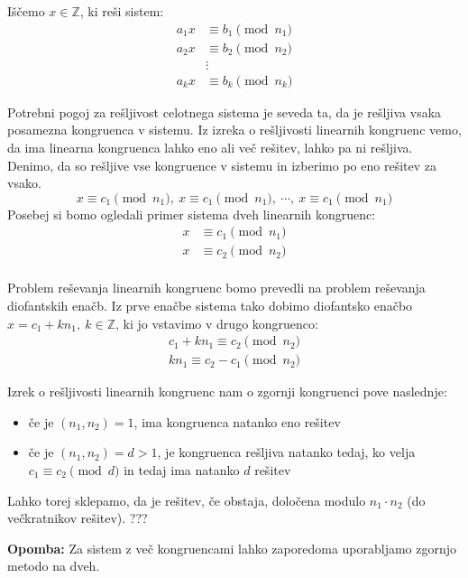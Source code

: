 \documentclass[12pt, a4paper]{article}
\newenvironment{opom}[1][]{\par\medskip\noindent \textbf{Opomba: }}{\medskip}
\begin{document}
Iščemo $x\in \mathbb{Z}$, ki reši sistem:
\begin{align*}
a_{1}x&\equiv b_{1} \pmod{n_{1}} \\
a_{2}x&\equiv b_{2} \pmod{n_{2}} \\
&\vdots \\
a_{k}x&\equiv b_{k} \pmod{n_{k}}
\end{align*} 

Potrebni pogoj za rešljivost celotnega sistema je seveda ta, da je rešljiva vsaka posamezna kongruenca v sistemu. Iz izreka o rešljivosti linearnih kongruenc vemo, da ima linearna kongruenca lahko eno ali več rešitev, lahko pa ni rešljiva. Denimo, da so rešljive vse kongruence v sistemu in izberimo po eno rešitev za vsako.
$$
x\equiv c_{1} \pmod{n_{1}},\  x\equiv c_{1} \pmod{n_{1}},\ \cdots,\  x\equiv c_{1} \pmod{n_{1}}
$$
Posebej si bomo ogledali primer sistema dveh linearnih kongruenc:
\begin{align*}
x&\equiv c_{1} \pmod{n_{1}} \\
x&\equiv c_{2} \pmod{n_{2}} \\
\end{align*}

Problem reševanja linearnih kongruenc bomo prevedli na problem reševanja diofantskih enačb. Iz prve enačbe sistema tako dobimo diofantsko enačbo $x=c_{1}+kn_{1},\ k\in \mathbb{Z}$, ki jo vstavimo v drugo kongruenco:
\begin{gather*}
c_{1} + kn_{1} \equiv c_{2} \pmod{n_{2}} \\
kn_{1}\equiv c_{2}-c_{1} \pmod{n_{2}}
\end{gather*}

Izrek o rešljivosti linearnih kongruenc nam o zgornji kongruenci pove naslednje:
\begin{itemize}
\item če je $(n_{1},n_{2})=1$, ima kongruenca natanko eno rešitev
\item če je $(n_{1},n_{2})=d>1$, je kongruenca rešljiva natanko tedaj, ko velja $c_{1}\equiv c_{2} \pmod d$ in tedaj ima natanko $d$ rešitev
\end{itemize}

Lahko torej sklepamo, da je rešitev, če obstaja, določena modulo $n_{1}\cdot n_{2}$ (do večkratnikov rešitev). ???

\begin{opom}
Za sistem z več kongruencami lahko zaporedoma uporabljamo zgornjo metodo na dveh.
\end{opom}
\end{document}
